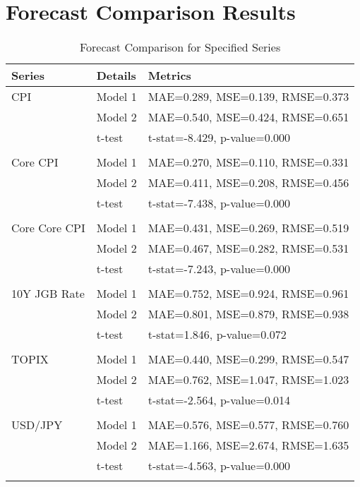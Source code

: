 \documentclass[a4paper,12pt]{article}
\begin{document}
\section*{Forecast Comparison Results}

\begin{table}
\caption{Forecast Comparison for Specified Series}
\label{tab:forecast_comparison_specified}
\begin{tabular}{llp{10cm}}
\toprule
Series & Details & Metrics \\
\midrule
CPI & Model 1 & MAE=0.289, MSE=0.139, RMSE=0.373 \\
 & Model 2 & MAE=0.540, MSE=0.424, RMSE=0.651 \\
 & t-test & t-stat=-8.429, p-value=0.000 \\
\arrayrulecolor{black!30}\midrule &  &  \\
Core CPI & Model 1 & MAE=0.270, MSE=0.110, RMSE=0.331 \\
 & Model 2 & MAE=0.411, MSE=0.208, RMSE=0.456 \\
 & t-test & t-stat=-7.438, p-value=0.000 \\
\arrayrulecolor{black!30}\midrule &  &  \\
Core Core CPI & Model 1 & MAE=0.431, MSE=0.269, RMSE=0.519 \\
 & Model 2 & MAE=0.467, MSE=0.282, RMSE=0.531 \\
 & t-test & t-stat=-7.243, p-value=0.000 \\
\arrayrulecolor{black!30}\midrule &  &  \\
10Y JGB Rate & Model 1 & MAE=0.752, MSE=0.924, RMSE=0.961 \\
 & Model 2 & MAE=0.801, MSE=0.879, RMSE=0.938 \\
 & t-test & t-stat=1.846, p-value=0.072 \\
\arrayrulecolor{black!30}\midrule &  &  \\
TOPIX & Model 1 & MAE=0.440, MSE=0.299, RMSE=0.547 \\
 & Model 2 & MAE=0.762, MSE=1.047, RMSE=1.023 \\
 & t-test & t-stat=-2.564, p-value=0.014 \\
\arrayrulecolor{black!30}\midrule &  &  \\
USD/JPY & Model 1 & MAE=0.576, MSE=0.577, RMSE=0.760 \\
 & Model 2 & MAE=1.166, MSE=2.674, RMSE=1.635 \\
 & t-test & t-stat=-4.563, p-value=0.000 \\
\arrayrulecolor{black!30}\midrule &  &  \\

\end{tabular}
\end{table}
\end{document}
